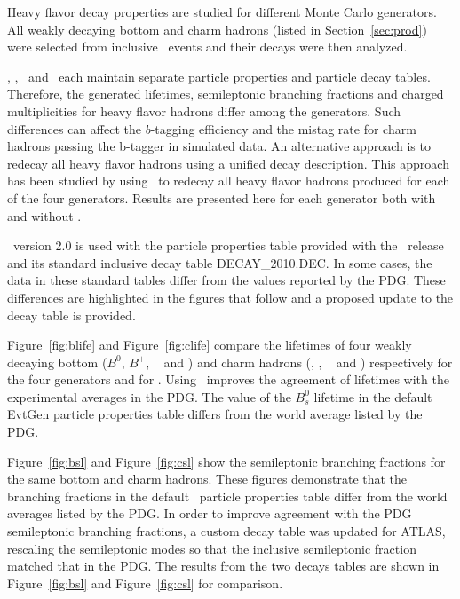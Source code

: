 Heavy flavor decay properties are studied for different Monte Carlo
generators.
All weakly decaying bottom and charm hadrons (listed in Section~\ref{sec:prod}) were selected from inclusive \ttbar\ events and their decays were then analyzed. 

\PythiaE, \Pythia, \Herwigpp\  and \Herwig\ each maintain separate particle properties and particle decay tables. 
Therefore, the  generated lifetimes, semileptonic branching fractions and charged multiplicities for heavy flavor 
hadrons differ among the generators. Such differences can affect the $b$-tagging efficiency and the mistag rate for 
charm hadrons passing the b-tagger in simulated data.
An alternative approach is to redecay all heavy flavor hadrons using a unified decay description.  
This approach has been studied by using \EvtGen\ to redecay all heavy flavor hadrons
produced for  each of the four generators.
Results are presented here for each generator both with and without \EvtGen.

\EvtGen\ version 2.0 is used with the particle properties table provided with the \EvtGen\ release 
and its standard inclusive decay table DECAY\_2010.DEC. In some cases, the data in these standard tables 
differ from the values reported by the PDG. 
These differences are highlighted in the figures that follow and a proposed update to the
decay table is provided.

Figure~\ref{fig:blife} and Figure~\ref{fig:clife}
compare the lifetimes of four weakly decaying bottom ($B^{0}$, $B^{+}$, 
\Bs~ and \Lb) and charm hadrons (\Dzero, \Dplus, \Ds~ and \Lc) respectively
for the four generators and for \EvtGen.
Using \EvtGen\ improves the agreement of lifetimes with the experimental averages in the PDG. 
The value of the $B_s^0$ lifetime in the default EvtGen particle properties table differs from the 
world average listed by the PDG.

Figure~\ref{fig:bsl} and Figure~\ref{fig:csl} show the semileptonic branching
fractions for the same bottom and charm hadrons.
These figures demonstrate that the branching fractions in the
default \EvtGen\ particle properties table differ from the world averages listed by the PDG. In order to improve agreement with the PDG semileptonic branching fractions, a custom decay table was updated for ATLAS, rescaling the semileptonic modes so that the inclusive semileptonic fraction matched that in the PDG. The results from the two decays tables are shown in Figure~\ref{fig:bsl} and Figure~\ref{fig:csl} for comparison.

